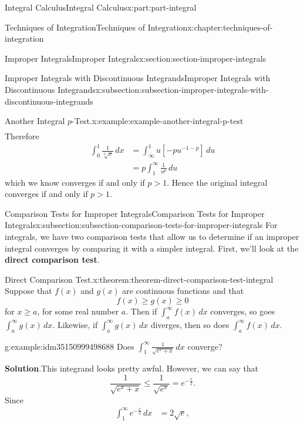 \documentclass[twoside,10pt,]{tufte-book}
\newcommand{\blocktitlefont}{\relax}
\newcommand{\terminology}[1]{\textbf{#1}}
\numberwithin{equation}{part}
\newcommand{\gt}{>}
\begin{document}
\begin{partptx}{Integral Calculus}{}{Integral Calculus}{}{}{x:part:part-integral}
\begin{chapterptx}{Techniques of Integration}{}{Techniques of Integration}{}{}{x:chapter:techniques-of-integration}
\begin{sectionptx}{Improper Integrals}{}{Improper Integrals}{}{}{x:section:section-improper-integrals}
\begin{subsectionptx}{Improper Integrals with Discontinuous Integrands}{}{Improper Integrals with Discontinuous Integrands}{}{}{x:subsection:subsection-improper-integrals-with-discontinuous-integrands}
\begin{example}{Another Integral \(p\)-Test.}{x:example:example-another-integral-p-test}
\begin{align*}
\end{align*}
Therefore%
\begin{align*}
\int_{0}^{1}\frac{1}{\sqrt[p]{x}}\,dx &= \int_{\infty}^{1}u\left[-pu^{-1 - p}\right]\,du\\
& = p\int_{1}^{\infty}\frac{1}{u^{p}}\,du
\end{align*}
which we know converges if and only if \(p \gt 1\). Hence the original integral converges if and only if \(p\gt1\).%
\end{example}
\end{subsectionptx}
%
%
\typeout{************************************************}
\typeout{************************************************}
%
\begin{subsectionptx}{Comparison Tests for Improper Integrals}{}{Comparison Tests for Improper Integrals}{}{}{x:subsection:subsection-comparison-tests-for-improper-integrals}
For integrals, we have two comparison tests that allow us to determine if an improper integral converges by comparing it with a simpler integral. First, we'll look at the \terminology{direct comparison test}.%
\begin{theorem}{Direct Comparison Test.}{}{x:theorem:theorem-direct-comparison-test-integral}%
%
Suppose that \(f(x)\) and \(g(x)\) are continuous functions and that%
\begin{equation*}
f(x) \geq g(x) \geq 0
\end{equation*}
for \(x\geq a\), for some real number \(a\). Then if \(\int_{a}^{\infty}f(x)\,dx\) converges, so goes \(\int_{a}^{\infty}g(x)\,dx\). Likewise, if \(\int_{a}^{\infty}g(x)\,dx\) diverges, then so does \(\int_{a}^{\infty}f(x)\,dx\).%
\end{theorem}
\begin{example}{}{g:example:idm35150999498688}%
Does \(\int_{1}^{\infty}\frac{1}{\sqrt{e^{x} + x}}\,dx\) converge?%
\par\smallskip%
\noindent\textbf{\blocktitlefont Solution}.\hypertarget{g:solution:idm35150999497792}{}\quad{}This integrand looks pretty awful. However, we can say that%
\begin{equation*}
\frac{1}{\sqrt{e^{x} + x}} \leq \frac{1}{\sqrt{e^{x}}} = e^{-\frac{x}{2}}.
\end{equation*}
Since%
\begin{align*}
\int_{1}^{\infty}e^{-\frac{x}{2}}\,dx & = 2\sqrt{e}, 
\end{align*}

\end{example}
\end{subsectionptx}
\end{sectionptx}
\end{chapterptx}
\end{partptx}
\end{document}

